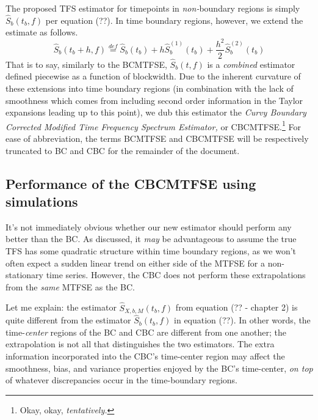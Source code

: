 \documentclass{article}
\begin{document}
The proposed TFS estimator for timepoints in \textit{non-}boundary regions is simply $\hat S_b(t_b,f)$ per equation (??). In time boundary regions, however, we extend the estimate as follows.
\begin{equation}
    \hat S_b (t_b+h,f) \stackrel{def}= 
    \hat S_b(t_b) + h\hat S^{(1)}_b(t_b) + \frac{h^2}2 \hat S^{(2)}_b(t_b)
\end{equation}
That is to say, similarly to the BCMTFSE, $\hat S_b (t,f)$ is a \textit{combined} estimator defined piecewise as a function of blockwidth. Due to the inherent curvature of these extensions into time boundary regions (in combination with the lack of smoothness which comes from including second order information in the Taylor expansions leading up to this point), we dub this estimator the \textit{Curvy Boundary Corrected Modified Time Frequency Spectrum Estimator,} or CBCMTFSE.\footnote{Okay, okay, \textit{tentatively.}} 
For ease of abbreviation, the terms BCMTFSE and CBCMTFSE will be respectively truncated to BC and CBC for the remainder of the document.   



\subsection{Performance of the CBCMTFSE using simulations}

It's not immediately obvious whether our new estimator should perform any better than the BC. As discussed, it \textit{may} be advantageous to assume the true TFS has some quadratic structure within time boundary regions, as we won't often expect a sudden linear trend on either side of the MTFSE for a non-stationary time series. However, the CBC does not perform these extrapolations from the \textit{same} MTFSE as the BC. 

Let me explain: the estimator $\hat S_{X,b,M}(t_b,f)$ from equation (?? - chapter 2) is quite different from the estimator $\hat S_b(t_b,f)$ in equation (??). In other words, the time-\textit{center} regions of the BC and CBC are different from one another; the extrapolation is not all that distinguishes the two estimators. The extra information incorporated into the CBC's time-center region may affect the smoothness, bias, and variance properties enjoyed by the BC's time-center, \textit{on top} of whatever discrepancies occur in the time-boundary regions.
\end{document}
